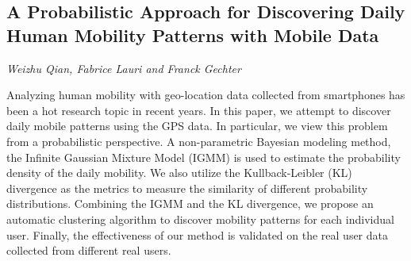 \documentclass[../booklet.tex]{subfiles}
\begin{document}
\subsection[A Probabilistic Approach for Discovering Daily Human Mobility Patterns with Mobile Data. {\it Weizhu Qian, Fabrice Lauri and Franck Gechter}]{A Probabilistic Approach for Discovering Daily Human Mobility Patterns with Mobile Data}
  

\begin{center}
  {\it Weizhu Qian, Fabrice Lauri and Franck Gechter}
\end{center}

\vskip 0.8cm


Analyzing human mobility with geo-location data collected from smartphones has been a hot research topic in recent years. In this paper, we attempt to discover daily mobile patterns using the GPS data. In particular, we view this problem from a probabilistic perspective. A non-parametric Bayesian modeling method, the Infinite Gaussian Mixture Model (IGMM) is used to estimate the probability density of the daily mobility. We also utilize the Kullback-Leibler (KL) divergence as the metrics to measure the similarity of different probability distributions. Combining the IGMM and the KL divergence, we propose an automatic clustering algorithm to discover mobility patterns for each individual user. Finally, the effectiveness of our method is validated on the real user data collected from different real users. 

\end{document}
